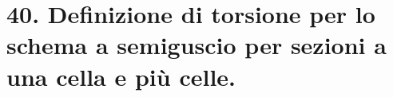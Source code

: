 \section{40. Definizione di torsione per lo schema a semiguscio per sezioni a una cella e più celle.}



